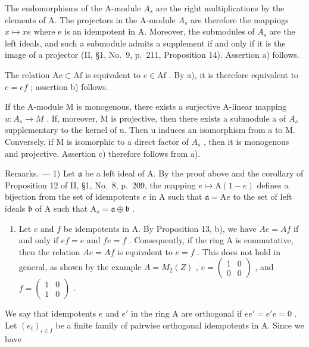 The endomorphisms of the A-module \(A_{s}\) are the right multiplications by the elements of A. The projectors in the A-module \(A_{s}\) are therefore the mappings \(x \mapsto xe\) where e is an idempotent in A. Moreover, the submodules of \(A_{s}\) are the left ideals, and such a submodule admits a supplement if and only if it is the image of a projector (II, §1, No.~9, p.~211, Proposition 14). Assertion a) follows.

The relation \(\mathrm{Ae} \subset \mathrm{Af}\) is equivalent to \(e \in \mathrm{Af}\) . By a), it is therefore equivalent to \(e = ef\) ; assertion b) follows.

If the A-module M is monogenous, there exists a surjective A-linear mapping \(u: A_{s} \to M\) . If, moreover, M is projective, then there exists a submodule a of \(A_{s}\) supplementary to the kernel of u. Then u induces an isomorphism from a to M. Conversely, if M is isomorphic to a direct factor of \(A_{s}\) , then it is monogenous and projective. Assertion c) therefore follows from a).

Remarks. --- 1) Let \(\mathfrak{a}\) be a left ideal of A. By the proof above and the corollary of Proposition 12 of II, §1, No.~8, p.~209, the mapping \(e \mapsto \mathrm{A}(1 - e)\) defines a bijection from the set of idempotents \(e\) in A such that \(\mathfrak{a} = \mathrm{A}e\) to the set of left ideals \(\mathfrak{b}\) of A such that \(\mathrm{A}_s = \mathfrak{a} \oplus \mathfrak{b}\) .

\begin{enumerate}
\def\labelenumi{\arabic{enumi})}
\setcounter{enumi}{1}
\tightlist
\item
  Let \(e\) and \(f\) be idempotents in A. By Proposition 13, b), we have \(Ae = Af\) if and only if \(ef = e\) and \(fe = f\) . Consequently, if the ring A is commutative, then the relation \(Ae = Af\) is equivalent to \(e = f\) . This does not hold in general, as shown by the example \(A = M_2(Z)\) , \(e = \begin{pmatrix} 1 & 0 \\ 0 & 0 \end{pmatrix}\) , and \(f = \begin{pmatrix} 1 & 0 \\ 1 & 0 \end{pmatrix}\) .
\end{enumerate}

We say that idempotents \(e\) and \(e'\) in the ring A are orthogonal if \(ee' = e'e = 0\) . Let \((e_i)_{i \in I}\) be a finite family of pairwise orthogonal idempotents in A. Since we have


